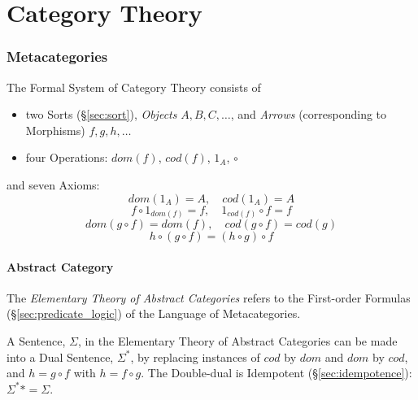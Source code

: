\part{Category Theory}\label{sec:category_theory}\cite{awodey06}\cite{maclane69}

\section{Metacategories}\label{sec:metacategory}

The Formal System of Category Theory consists of
\begin{itemize}
\item two Sorts (\S\ref{sec:sort}), \emph{Objects} $A,B,C,\ldots$, and
  \emph{Arrows} (corresponding to Morphisms) $f,g,h,\ldots$
\item four Operations: $dom(f)$, $cod(f)$, $1_A$, $\circ$
\end{itemize}
and seven Axioms:
\[
    dom(1_A) = A,\quad cod(1_A) = A
\]\[
    f \circ 1_{dom(f)} = f, \quad 1_{cod(f)} \circ f = f
\]\[
    dom(g\circ f) = dom(f), \quad cod(g \circ f) = cod(g)
\]\[
    h \circ (g \circ f) = (h \circ g) \circ f
\]



\subsection{Abstract Category}\label{sec:abstract_category}

The \emph{Elementary Theory of Abstract Categories} refers to the
First-order Formulas (\S\ref{sec:predicate_logic}) of the Language
of Metacategories.

A Sentence, $\Sigma$, in the Elementary Theory of Abstract Categories
can be made into a Dual Sentence, $\Sigma^*$, by replacing instances
of $cod$ by $dom$ and $dom$ by $cod$, and $h = g \circ f$ with $h = f
\circ g$. The Double-dual is Idempotent (\S\ref{sec:idempotence}):
$\Sigma^** = \Sigma$.

